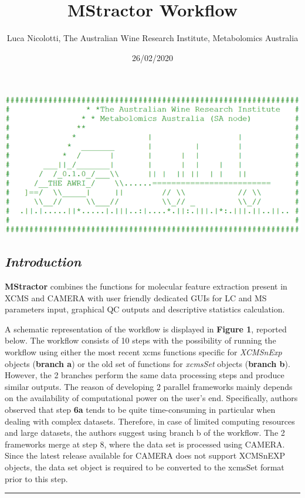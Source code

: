 \documentclass[
]{article}
\title{MStractor Workflow}
\author{Luca Nicolotti, The Australian Wine Research Institute,
Metabolomics Australia}
\date{26/02/2020}
\begin{document}
\maketitle

\includegraphics{./vignettespicture.png}

\hypertarget{introduction}{%
\subsection{\texorpdfstring{\emph{Introduction}}{Introduction}}\label{introduction}}

\textbf{MStractor} combines the functions for molecular feature
extraction present in XCMS and CAMERA with user friendly dedicated GUIs
for LC and MS parameters input, graphical QC outputs and descriptive
statistics calculation.

A schematic representation of the workflow is displayed in
\textbf{Figure 1}, reported below. The workflow consists of 10 steps
with the possibility of running the workflow using either the most
recent xcms functions specific for \emph{XCMSnExp} objects
(\textbf{branch a}) or the old set of functions for \emph{xcmsSet}
objects (\textbf{branch b}). However, the 2 branches perform the same
data processing steps and produce similar outputs. The reason of
developing 2 parallel frameworks mainly depends on the availability of
computational power on the user's end. Specifically, authors observed
that step \textbf{6a} tends to be quite time-consuming in particular
when dealing with complex datasets. Therefore, in case of limited
computing resources and large datasets, the authors suggest using branch
b of the workflow. The 2 frameworks merge at step 8, where the data set
is processed using CAMERA. Since the latest release available for CAMERA
does not support XCMSnEXP objects, the data set object is required to be
converted to the xcmsSet format prior to this step.

\begin{center}\rule{0.5\linewidth}{0.5pt}\end{center}
\end{document}
